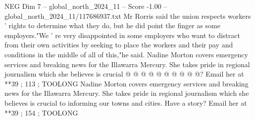 \begin{textsample}{NEG Dim 7 – global\_north\_2024\_11 – Score -1.00 – global\_north\_2024\_11/117686937.txt}
Mr Rorris said the union respects workers ' rights to determine what they do, but he did point the finger as some employers."We ' re very disappointed in some employers who want to distract from their own activities by seeking to place the workers and their pay and conditions in the middle of all of this,"he said.
Nadine Morton covers emergency services and breaking news for the Illawarra Mercury.
She takes pride in regional journalism which she believes is crucial @ @ @ @ @ @ @ @ @ @?
Email her at **39 ; 113 ; TOOLONG Nadine Morton covers emergency services and breaking news for the Illawarra Mercury.
She takes pride in regional journalism which she believes is crucial to informing our towns and cities.
Have a story?
Email her at **39 ; 154 ; TOOLONG

\end{textsample}
